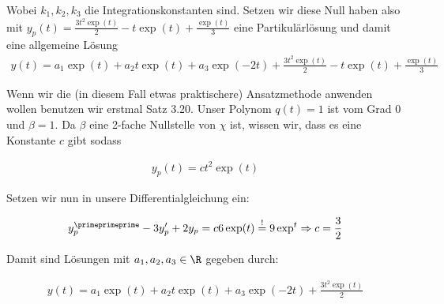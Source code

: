 \begin{solution}
Wobei $k_1,k_2,k_3$ die Integrationskonstanten sind. Setzen wir diese Null haben
also mit $y_p(t) = \frac{3t^2 \exp(t)}{2} - t\exp(t) + \frac{\exp(t)}{3}$ eine
Partikulärlösung und damit eine allgemeine Lösung
\begin{align*}
  y(t) = a_1 \exp(t) + a_2 t\exp(t) + a_3\exp(-2t) + \frac{3t^2 \exp(t)}{2} - t\exp(t) + \frac{\exp(t)}{3}
\end{align*}

Wenn wir die (in diesem Fall etwas praktischere) Ansatzmethode anwenden wollen
benutzen wir erstmal Satz 3.20. Unser Polynom $q(t)=1$ ist vom Grad 0 und $\beta=1$.
Da $\beta$ eine 2-fache Nullstelle von $\chi$ ist, wissen wir, dass es eine
Konstante $c$ gibt sodass

\begin{align*}
  y_p (t) = ct^2 \exp(t)
\end{align*}

Setzen wir nun in unsere Differentialgleichung ein:

\begin{align*}
  y_p^\primeprimeprime -3y_p^\prime +2y_p =
  c6\exp(t) \stackrel{!}{=} 9\exp^t
  \Rightarrow c = \frac{3}{2}
\end{align*}

Damit sind Lösungen mit $a_1 ,a_2 ,a_3 \in \R$ gegeben durch:

\begin{align*}
  y(t) = a_1 \exp(t) + a_2 t\exp(t) + a_3\exp(-2t) + \frac{3t^2 \exp(t)}{2}
\end{align*}

\end{solution}
